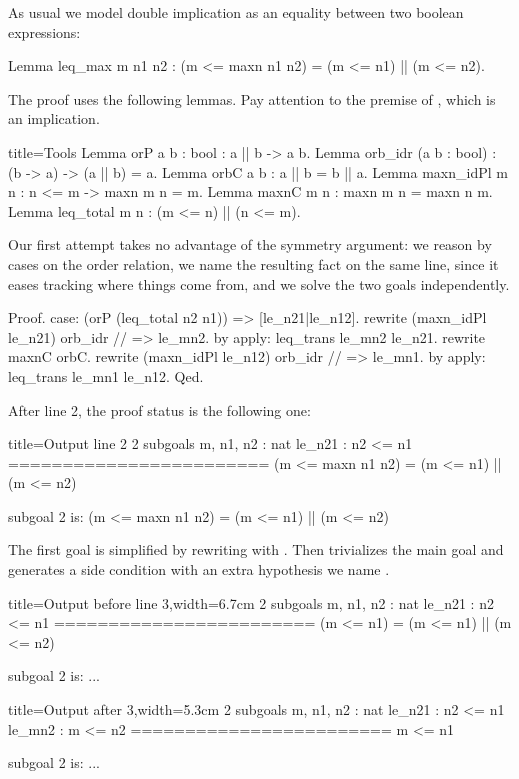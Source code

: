 As usual we model double implication as an equality between two
boolean expressions:

\begin{coq}{}{}
Lemma leq_max m n1 n2 : (m <= maxn n1 n2) = (m <= n1) || (m <= n2).
\end{coq}

The proof uses the following lemmas.  Pay attention to the premise of
, which is an implication.

\begin{coq}{}{title=Tools}
Lemma orP {a b : bool} : a || b -> a \/ b.
Lemma orb_idr (a b : bool) : (b -> a) -> (a || b) = a.
Lemma orbC a b : a || b = b || a.
Lemma maxn_idPl {m n} : n <= m -> maxn m n = m.
Lemma maxnC m n : maxn m n = maxn n m.
Lemma leq_total m n : (m <= n) || (n <= m).
\end{coq}

Our first attempt takes no advantage of the symmetry argument: we
reason by cases on the order relation, we name the resulting fact on
the same line, since it eases tracking where things come from, and we
solve the two goals independently.

\begin{coq}{}{}
Proof.
case: (orP (leq_total n2 n1)) => [le_n21|le_n12].
  rewrite (maxn_idPl le_n21) orb_idr // => le_mn2.
  by apply: leq_trans le_mn2 le_n21.
rewrite maxnC orbC.
rewrite (maxn_idPl le_n12) orb_idr // => le_mn1.
by apply: leq_trans le_mn1 le_n12.
Qed.
\end{coq}

After line 2, the proof status is the following one:

\begin{coqout}{}{title=Output line 2}
2 subgoals
m, n1, n2 : nat
le_n21 : n2 <= n1
========================
(m <= maxn n1 n2) = (m <= n1) || (m <= n2)

subgoal 2 is:
(m <= maxn n1 n2) = (m <= n1) || (m <= n2)
\end{coqout}

The first goal is simplified by
rewriting with . %
Then  trivializes the main goal and generates a side condition with
an extra hypothesis we name .

\begin{coqout}{}{title=Output before line 3,width=6.7cm}
2 subgoals
m, n1, n2 : nat
le_n21 : n2 <= n1
========================
(m <= n1) = (m <= n1) || (m <= n2)

subgoal 2 is: ...
\end{coqout}
\begin{coqout}{}{title=Output after 3,width=5.3cm}
2 subgoals
m, n1, n2 : nat
le_n21 : n2 <= n1
le_mn2 : m <= n2
========================
m <= n1

subgoal 2 is: ...
\end{coqout}

